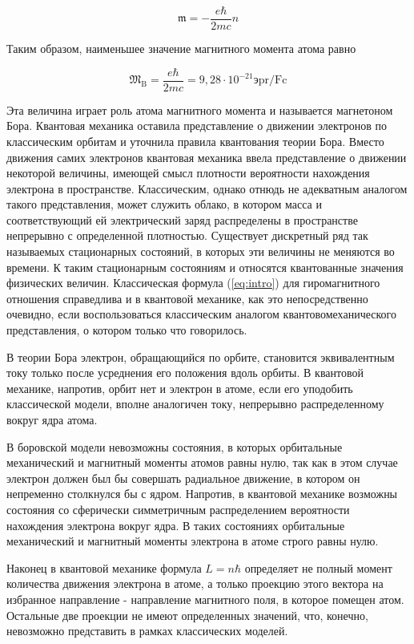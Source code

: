 \documentclass[12pt]{article}
\begin{document}
  \begin{equation}
    \mathfrak{m}=-\frac{e \hbar}{2 m c} n
  \end{equation}


  Таким образом, наименьшее значение магнитного момента атома равно

  \begin{equation}
    \mathfrak{M}_{\mathrm{B}}=\frac{e \hbar}{2 m c}=9,28 \cdot 10^{-21} э \mathrm{pr} / \mathrm{Fc}
  \end{equation}

  Эта величина играет роль атома магнитного момента и называется магнетоном Бора.
  Квантовая механика оставила представление о движении электронов по классическим орбитам и уточнила правила квантования теории Бора. Вместо движения самих электронов квантовая механика ввела представление о движении некоторой величины, имеющей смысл плотности вероятности нахождения электрона в пространстве. Классическим, однако отнюдь не адекватным аналогом такого представления, может служить облако, в котором масса и соответствующий ей электрический заряд распределены в пространстве непрерывно с определенной плотностью. Существует дискретный ряд так называемых стационарных состояний, в которых эти величины не меняются во времени. К таким стационарным состояниям и относятся квантованные значения физических величин. Классическая формула (\ref{eq:intro}) для гиромагнитного отношения справедлива и в квантовой механике, как это непосредственно очевидно, если воспользоваться классическим аналогом квантовомеханического представления, о котором только что говорилось.

  В теории Бора электрон, обращающийся по орбите, становится эквивалентным току только после усреднения его положения вдоль орбиты. В квантовой механике, напротив, орбит нет и электрон в атоме, если его уподобить классической модели, вполне аналогичен току, непрерывно распределенному вокруг ядра атома.

  В боровской модели невозможны состояния, в которых орбитальные механический и магнитный моменты атомов равны нулю, так как в этом случае электрон должен был бы совершать радиальное движение, в котором он непременно столкнулся бы с ядром. Напротив, в квантовой механике возможны состояния со сферически симметричным распределением вероятности нахождения электрона вокруг ядра. В таких состояниях орбитальные механический и магнитный моменты электрона в атоме строго равны нулю.


  Наконец в квантовой механике формула $L=n \hbar$ определяет не полный момент количества движения электрона в атоме, а только проекцию этого вектора на избранное направление - направление магнитного поля, в которое помещен атом. Остальные две проекции не имеют определенных значений, что, конечно, невозможно представить в рамках классических моделей.
\end{document}
